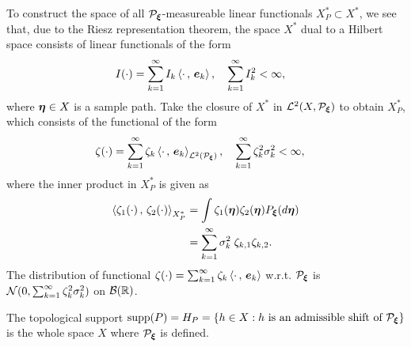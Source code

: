 \documentclass[11pt]{article}
\begin{document}
\begin{itemize}
To construct the space of all ${\mathcal P}_{\boldsymbol{\xi}}$-measureable linear functionals $X_{P}^{*}\subset X^{*}$, we see that, due to the Riesz representation theorem, the space $X^{*}$ dual to a Hilbert space consists of linear functionals of the form
\begin{align*}
I(\cdot) &= \sum_{k=1}^{\infty}I_{k}\left\langle \cdot\,,\, \boldsymbol{e}_{k} \right\rangle, \quad \sum_{k=1}^{\infty}I_{k}^{2}< \infty,
\end{align*} where $\boldsymbol{\eta}\in X$ is a sample path. 
Take the closure of $X^{*}$ in ${\mathcal L}^{2}(X, {\mathcal P}_{\boldsymbol{\xi}})$ to obtain $X_{P}^{*}$, which consists of the functional of the form
\begin{align}
\zeta(\cdot) &=  \sum_{k=1}^{\infty}\zeta_{k}\left\langle \cdot\,,\, \boldsymbol{e}_{k} \right\rangle_{{\mathcal L}^{2}({\mathcal P}_{\boldsymbol{\xi}})}, \quad \sum_{k=1}^{\infty}\zeta_{k}^{2}\sigma_{k}^{2}< \infty,
\end{align}
where the inner product in $X_{P}^{*}$ is given as 
\begin{align*}
\left\langle \zeta_{1}(\cdot)\,,\, \zeta_{2}(\cdot) \right\rangle_{X_{P}^{*}} &= \int \zeta_{1}(\boldsymbol{\eta})\zeta_{2}(\boldsymbol{\eta})P_{\boldsymbol{\xi}}(d\boldsymbol{\eta})\\
&= \sum_{k=1}^{\infty}\sigma_{k}^{2}\;\zeta_{k,1}\zeta_{k,2}.
\end{align*} The distribution of functional $\zeta(\cdot) = \sum_{k=1}^{\infty}\zeta_{k}\left\langle \cdot\,,\, \boldsymbol{e}_{k} \right\rangle $ w.r.t. ${\mathcal P}_{\boldsymbol{\xi}}$ is ${\mathcal N}(0, \sum_{k=1}^{\infty}\zeta_{k}^{2}\sigma_{k}^{2})$ on ${\mathcal B}({\mathbb R})$. 

The topological support $\text{supp}(P) = H_{P}=\left\{h\in X: h \text{ is an admissible shift of }{\mathcal P}_{\boldsymbol{\xi}}\right\}$ is the whole space $X$ where ${\mathcal P}_{\boldsymbol{\xi}}$ is defined.\\[10pt]



\end{itemize}
\end{document}
